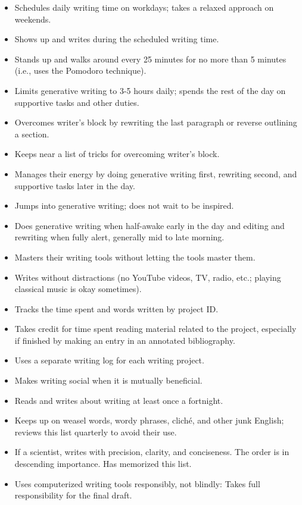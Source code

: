 \documentclass[11pt,letterpaper]{article}
\begin{document}
\begin{itemize}
\item Schedules daily writing time on workdays; takes a relaxed approach on weekends.
\item Shows up and writes during the scheduled writing time.
\item Stands up and walks around every 25 minutes for no more than 5 minutes (i.e., uses the Pomodoro technique).
\item Limits generative writing to 3-5 hours daily; spends the rest of the day on supportive tasks and other duties.
\item Overcomes writer's block by rewriting the last paragraph or reverse outlining a section.
\item Keeps near a list of tricks for overcoming writer's block.
\item Manages their energy by doing generative writing first, rewriting second, and supportive tasks later in the day.
\item Jumps into generative writing; does not wait to be inspired.
\item Does generative writing when half-awake early in the day and editing and rewriting when fully alert, generally mid to late morning.
\item Masters their writing tools without letting the tools master them.
\item Writes without distractions (no YouTube videos, TV, radio, etc.; playing classical music is okay sometimes).
\item Tracks the time spent and words written by project ID.
\item Takes credit for time spent reading material related to the project, especially if finished by making an entry in an annotated bibliography.
\item Uses a separate writing log for each writing project.
\item Makes writing social when it is mutually beneficial.
\item Reads and writes about writing at least once a fortnight.
\item Keeps up on weasel words,  wordy phrases, cliché, and other junk English; reviews this list quarterly to avoid their use.
\item If a scientist, writes with precision, clarity, and conciseness. The order is in descending importance. Has memorized this list.
\item Uses computerized writing tools responsibly, not blindly: Takes full responsibility for the final draft.

\end{itemize}
\end{document}
